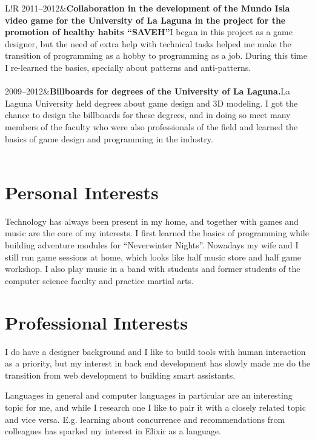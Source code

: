 \documentclass[10pt]{article}
\newcommand\VRule{\color{lightgray}\vrule width 0.5pt}
\begin{document}
\begin{tabular}{L!{\VRule}R}
        2011--2012&{{\bf Collaboration in the development of the Mundo Isla video game for the University of La Laguna in the project for the promotion of healthy habits ``SAVEH''}\newline I began in this project as a game designer, but the need of extra help with technical tasks helped me make the transition of programming as a hobby to programming as a job. During this time I re-learned the basics, specially about patterns and anti-patterns.}\\\\

        2009--2012&{{\bf Billboards for degrees of the University of La Laguna.}\newline La Laguna University held degrees about game design and 3D modeling. I got the chance to design the billboards for these degrees, and in doing so meet many members of the faculty who were also professionals of the field and learned the basics of game design and programming in the industry.}\\\\

    \end{tabular}

    \section*{Personal Interests}
    Technology has always been present in my home, and together with games and music are the core of my interests. I first learned the basics of programming while building adventure modules for “Neverwinter Nights”. Nowadays my wife and I still run game sessions at home, which looks like half music store and half game workshop. I also play music in a band with students and former students of the computer science faculty and practice martial arts.

    \section*{Professional Interests}
    I do have a designer background and I like to build tools with human
    interaction as a priority, but my interest in back end development has
    slowly made me do the transition from web development to building smart
    assistants.

    Languages in general and computer languages in particular are an
    interesting topic for me, and while I research one I like to pair it with a
    closely related topic and vice versa. E.g. learning about concurrence and
    recommendations from colleagues has sparked my interest in Elixir as a
    language.
\end{document}
